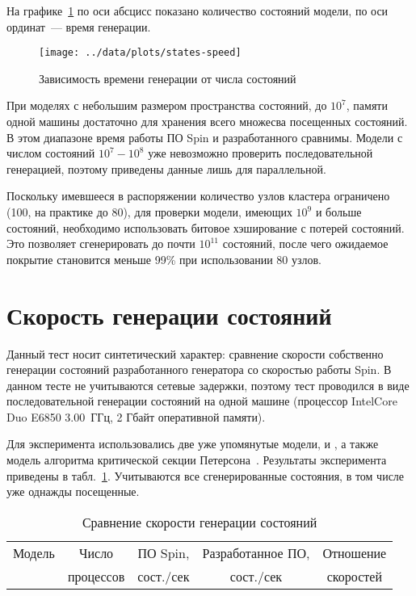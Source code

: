На графике~\ref{fig:states-speed} по оси абсцисс показано количество состояний модели, по
оси ординат~--- время генерации.

\begin{figure}[ht]
  \centering
  \texttt{[image: ../data/plots/states-speed]}
  \caption{Зависимость времени генерации от числа состояний}
  \label{fig:states-speed}
\end{figure}

При моделях с небольшим размером пространства состояний, до $10^7$, памяти одной машины
достаточно для хранения всего множесва посещенных состояний. В этом диапазоне время работы
ПО Spin и разработанного сравнимы. Модели с числом состояний $10^7-10^8$ уже невозможно
проверить последовательной генерацией, поэтому приведены данные лишь для
параллельной. 

Поскольку имевшееся в распоряжении количество узлов кластера ограничено (100, на практике
до 80), для проверки модели, имеющих $10^9$ и больше состояний, необходимо использовать
битовое хэширование с потерей состояний. Это позволяет сгенерировать до почти $10^{11}$
состояний, после чего ожидаемое покрытие становится меньше 99\% при использовании 80
узлов.

\section{Скорость генерации состояний}
\label{sec:stategen-speed}

Данный тест носит синтетический характер: сравнение скорости собственно генерации
состояний разработанного генератора со скоростью работы Spin. В данном тесте не
учитываются сетевые задержки, поэтому тест проводился в виде последовательной генерации
состояний на одной машине (процессор Intel\regsign Core Duo E6850 3.00~ГГц, 2
Гбайт оперативной памяти).

Для эксперимента использовались две уже упомянутые модели,  и ,
а также модель алгоритма критической секции Петерсона~\cite{SPIN}. Результаты эксперимента
приведены в табл.~\ref{tab:stategen-speed}. Учитываются все сгенерированные состояния, в
том числе уже однажды посещенные.

\begin{table}[ht]
  \centering
  \caption{Сравнение скорости генерации состояний}
  \begin{tabular}{ccccc}
    \hline
    Модель & Число     & ПО Spin,   & Разработанное ПО, & Отношение \\
           & процессов & сост./сек &  сост./сек         & скоростей \\
    \hline
    
    \hline
  \end{tabular}
  \label{tab:stategen-speed}
\end{table}

